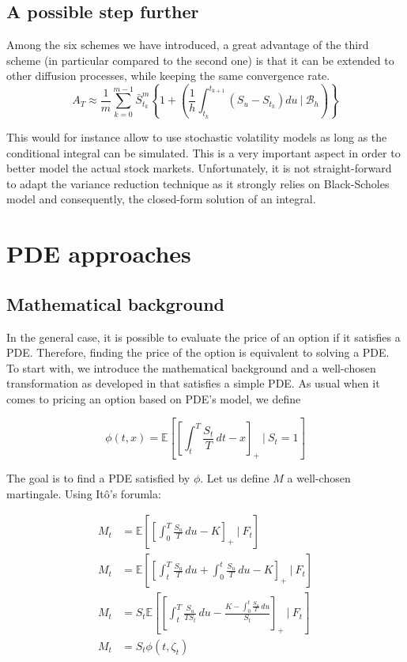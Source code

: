 \documentclass{article}
\begin{document}
\subsection{A possible step further}

Among the six schemes we have introduced, a great advantage of the third scheme (in particular compared to the
second one) is that it can be extended to other diffusion processes, while keeping the same convergence rate.
\begin{equation}
    A_T \approx \frac{1}{m} \sum_{k=0}^{m-1}
    	\bar S_{t_k}^m \left\{ 1 +
		\left( \frac{1}{h} \int_{t_k}^{t_{k+1}} \left( S_u - S_{t_k} \right) du \ \Big\vert \ \mathcal B_h \right) \right\} \tag{3+}
\end{equation}

This would for instance allow to use stochastic volatility models as long as the conditional integral can be simulated.
This is a very important aspect in order to better model the actual stock markets.
Unfortunately, it is not straight-forward to adapt the variance reduction technique as it strongly relies on
Black-Scholes model and consequently, the closed-form solution of an integral.

\section{PDE approaches}

\subsection{Mathematical background}

In the general case, it is possible to evaluate the price of an option if it satisfies a PDE.
Therefore, finding the price of the option is equivalent to solving a PDE.
To start with, we introduce the mathematical background and a well-chosen transformation as developed 
in \cite{Rogers} that satisfies a simple PDE.
As usual when it comes to pricing an option based on PDE's model, we define

\begin{equation}
	\phi(t,x) = \mathbb E \left[ \left[ \int_{t}^{T} \frac{S_{t}}{T}\,dt-x \right]_{+} \ \big\vert \ S_{t}=1 \right]
	\tag{I}
\end{equation}

The goal is to find a PDE satisfied by $\phi$. Let us define $M$ a well-chosen martingale.
Using It\^o's forumla:

\begin{align*}
        M_{t} &= \mathbb E \left[ \left[ \int_{0}^{T} \frac{S_{u}}{T}\,du-K \right]_{+} \ \Big\vert \ F_{t} \right] \\
        M_{t} &= \mathbb E \left[ \left[ \int_{t}^{T} \frac{S_{u}}{T}\,du+\int_{0}^{t} \frac{S_{u}}{T}\,du-K \right]_{+}
        	 \ \Big\vert \ F_{t} \right]  \\
        M_{t} &= S_{t} \mathbb E \left[ \left[ \int_{t}^{T} \frac{S_{u}}
        {TS_{t}}\,du -\frac{K-\int_{0}^{t} \frac{S_{u}}{T}\,du}{S_{t}} \right]_{+} \ \Big\vert \ F_{t} \right] \\
        M_{t} &= S_{t}\phi(t,\zeta_{t})
\end{align*}
\end{document}
